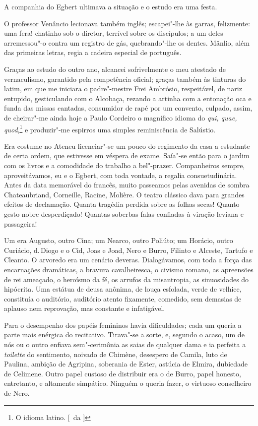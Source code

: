 A companhia do Egbert ultimava a situação e o estudo era uma festa. 

O professor Venâncio
lecionava também inglês; escapei"-lhe às garras, felizmente: uma fera!
chatinho sob o diretor, terrível sobre os discípulos; a um deles
arremessou"-o contra um registro de gás, quebrando"-lhe os dentes.
Mânlio, além das primeiras letras, regia a cadeira especial de
português. 

Graças ao estudo do outro ano, alcancei sofrivelmente o meu
atestado de vernaculismo, garantido pela competência oficial; graças
também às tinturas do latim, em que me iniciara o padre"-mestre Frei
Ambrósio, respeitável, de nariz entupido, gesticulando com o Alcobaça,
rezando a artinha com a entonação oca e funda das missas cantadas,
consumidor de rapé por um convento, culpado, assim, de cheirar"-me
ainda hoje a Paulo Cordeiro o magnífico idioma do \textit{qui, quae, quod},\footnote{ O idioma 
latino. [~da ]} e produzir"-me espirros uma simples reminiscência de Salústio. 

Era costume no Ateneu licenciar"-se um pouco do regimento da casa a
estudante de certa ordem, que estivesse em véspera de exame. Saía"-se
então para o jardim com os livros e a comodidade do trabalho a
bel"-prazer. Companheiros sempre, aproveitávamos, eu e o Egbert, com
toda vontade, a regalia consuetudinária. Antes da data memorável do
francês, muito passeamos pelas avenidas de sombra Chateaubriand,
Corneille, Racine, Molière. O teatro clássico dava para grandes efeitos
de declamação. Quanta tragédia perdida sobre as folhas secas! Quanto
gesto nobre desperdiçado! Quantas soberbas falas confiadas à viração
leviana e passageira! 

Um era Augusto, outro Cina; um Nearco, outro
Poliúto; um Horácio, outro Curiácio, d.\,Diogo e o Cid, Joas e Joad,
Nero e Burro, Filinto e Alceste, Tartufo e Cleanto. O arvoredo era um
cenário deveras. Dialogávamos, com toda a força das encarnações
dramáticas, a bravura cavalheiresca, o civismo romano, as apreensões de
rei ameaçado, o heroísmo da fé, os arrufos da misantropia, as
sinuosidades do hipócrita. Uma estátua de deusa anônima, de louça
esfolada, verde de velhice, constituía o auditório, auditório atento
fixamente, comedido, sem demasias de aplauso nem reprovação, mas
constante e infatigável. 

Para o desempenho dos papéis femininos havia
dificuldades; cada um queria a parte mais enérgica do recitativo.
Tirava"-se a sorte, e, segundo o acaso, um de nós ou o outro enfiava
sem"-cerimônia as saias de qualquer dama e ia perfeita a \textit{toilette} do
sentimento, noivado de Chimène, desespero de Camila, luto de Paulina,
ambição de Agripina, soberania de Ester, astúcia de Elmira, dubiedade
de Celimene. Outro papel custoso de distribuir era o de Burro, papel
honesto, entretanto, e altamente simpático. Ninguém o queria fazer, o
virtuoso conselheiro de Nero. 

